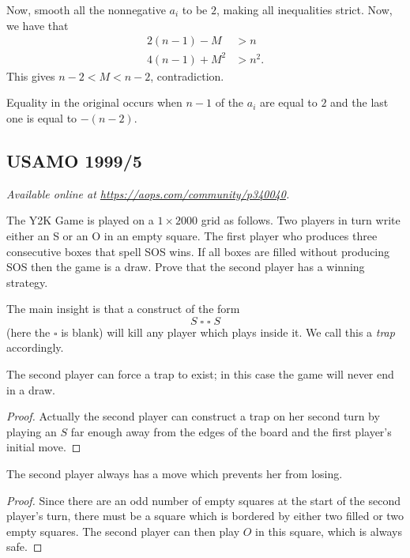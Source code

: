 \documentclass[11pt]{scrartcl}
\begin{document}
Now, smooth all the nonnegative $a_i$ to be $2$,
making all inequalities strict.
Now, we have that
\begin{align*}
  2(n-1) - M &> n \\
  4(n-1) + M^2 &> n^2.
\end{align*}
This gives $n-2 < M < n-2$, contradiction.

Equality in the original occurs when $n-1$ of the $a_i$ are equal to $2$
and the last one is equal to $-(n-2)$.
\pagebreak

\subsection{USAMO 1999/5}
\textsl{Available online at \url{https://aops.com/community/p340040}.}
\begin{mdframed}[style=mdpurplebox,frametitle={Problem statement}]
The Y2K Game is played on a $1 \times 2000$ grid as follows.
Two players in turn write either an S or an O in an empty square.
The first player who produces three consecutive boxes that spell SOS wins.
If all boxes are filled without producing SOS then the game is a draw.
Prove that the second player has a winning strategy.
\end{mdframed}
The main insight is that a construct of the form
\[ S \; \square \; \square \; S \]
(here the $\square$ is blank)
will kill any player which plays inside it.
We call this a \emph{trap} accordingly.

\begin{claim*}
  The second player can force a trap to exist;
  in this case the game will never end in a draw.
\end{claim*}
\begin{proof}
  Actually the second player can construct a trap
  on her second turn by playing an $S$ far enough away
  from the edges of the board and the first player's initial move.
\end{proof}

\begin{claim*}
  The second player always has a move which prevents
  her from losing.
\end{claim*}
\begin{proof}
  Since there are an odd number of empty squares at the start of
  the second player's turn,
  there must be a square which is bordered by either
  two filled or two empty squares.
  The second player can then play $O$ in this square,
  which is always safe.
\end{proof}
\end{document}
